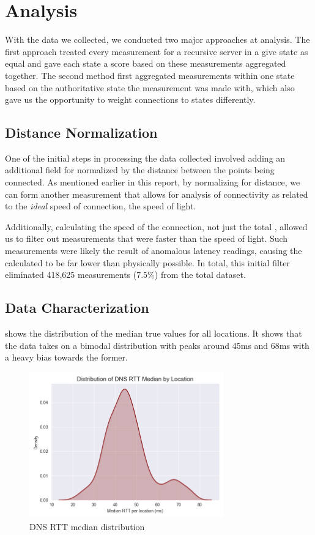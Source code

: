 \section{Analysis}\label{sec:dns_analysis}

With the data we collected, we conducted two major approaches at analysis. The first approach treated every measurement for a recursive server in a give state as equal and gave each state a score based on these measurements aggregated together. The second method first aggregated measurements within one state based on the authoritative state the measurement was made with, which also gave us the opportunity to weight connections to states differently.

\subsection{Distance Normalization}
One of the initial steps in processing the data collected involved adding an additional field for \rtt normalized by the distance between the points being connected. As mentioned earlier in this report, by normalizing for distance, we can form another measurement that allows for analysis of connectivity as related to the \textit{ideal} speed of connection, the speed of light.

Additionally, calculating the speed of the connection, not just the total \rtt, allowed us to filter out measurements that were faster than the speed of light. Such measurements were likely the result of anomalous latency readings, causing the calculated \rtt to be far lower than physically possible. In total, this initial filter eliminated 418,625 measurements (7.5\%) from the total dataset.

\subsection{Data Characterization}

 shows the distribution of the median true \rtt values for all locations. It shows that the data takes on a bimodal distribution with peaks around 45ms and 68ms with a heavy bias towards the former.

\begin{figure}[htb]
    \centering
    \includegraphics[width=0.75\textwidth]{images/dns/dist_raw_data/dns_rtt_median_distribution.png}
    \caption{DNS RTT median distribution}
    \label{fig:dns_analytics_median_dist}
\end{figure}

